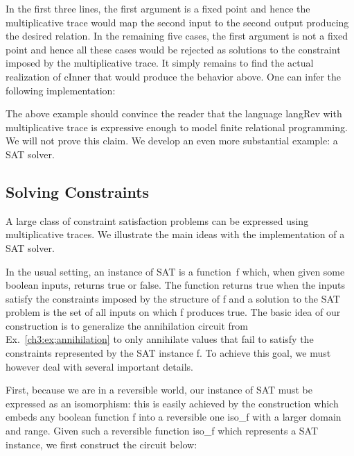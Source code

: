 \documentclass{llncs}
\begin{document}
In the first three lines, the first argument is a fixed point and hence the
multiplicative trace would map the second input to the second output
producing the desired relation. In the remaining five cases, the first
argument is not a fixed point and hence all these cases would be rejected as
solutions to the constraint imposed by the multiplicative trace. It simply
remains to find the actual realization of {{cInner}} that would produce the
behavior above. One can infer the following implementation:

%     

The above example should convince the reader that the language {{langRev}}
with multiplicative trace is expressive enough to model finite relational
programming. We will not prove this claim. We develop an even more
substantial example: a SAT solver.

\subsection{Solving Constraints}
\label{ch3:sec:constraints}

A large class of constraint satisfaction problems can be expressed
using multiplicative traces. We illustrate the main ideas with the
implementation of a SAT solver.

In the usual setting, an instance of SAT is a function~{{f}} which,
when given some boolean inputs, returns {{true}} or {{false}}. The
function returns {{true}} when the inputs satisfy the constraints
imposed by the structure of {{f}} and a solution to the SAT problem is
the set of all inputs on which {{f}} produces {{true}}. The basic idea
of our construction is to generalize the annihilation circuit from
Ex.~\ref{ch3:ex;annihilation} to only annihilate values that fail to
satisfy the constraints represented by the SAT instance {{f}}. To
achieve this goal, we must however deal with several important
details.

First, because we are in a reversible world, our instance of SAT must be
expressed as an isomorphism: this is easily achieved by the construction
which embeds any boolean function {{f}} into a reversible one {{iso_f}} with
a larger domain and range.  Given such a reversible function {{iso_f}} which
represents a SAT instance, we first construct the circuit below:
\end{document}
